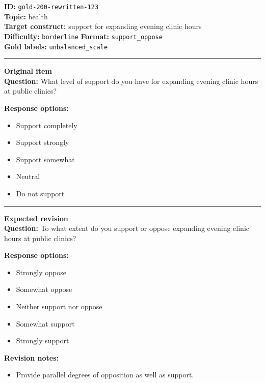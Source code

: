 \documentclass[10pt,a4paper]{article}
\newcommand{\sectionline}{\vspace{0.15em}\hrule\vspace{0.35em}}
\begin{document}
\begin{tcolorbox}[colframe=FlawRed,colback=white,colbacktitle=FlawRed!9,coltitle=black,title={Item 123\hfill Flawed item}]
\textbf{ID:} \texttt{gold-200-rewritten-123}\\
\textbf{Topic:} health\\
\textbf{Target construct:} support for expanding evening clinic hours\\
\textbf{Difficulty:} \texttt{borderline} \quad \textbf{Format:} \texttt{support\_oppose}\\
\textbf{Gold labels:} \texttt{unbalanced\_scale}\\
\sectionline
\textbf{Original item}\\
\textbf{Question:} What level of support do you have for expanding evening clinic hours at public clinics?
\par\textbf{Response options:}
\begin{itemize}
\item Support completely
\item Support strongly
\item Support somewhat
\item Neutral
\item Do not support
\end{itemize}
\sectionline
\textbf{Expected revision}\\
\textbf{Question:} To what extent do you support or oppose expanding evening clinic hours at public clinics?
\par\textbf{Response options:}
\begin{itemize}
\item Strongly oppose
\item Somewhat oppose
\item Neither support nor oppose
\item Somewhat support
\item Strongly support
\end{itemize}
\par\textbf{Revision notes:}
\begin{itemize}
\item Provide parallel degrees of opposition as well as support.
\end{itemize}
\end{tcolorbox}
\end{document}
